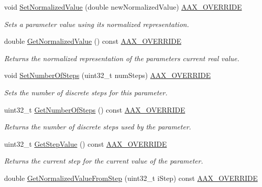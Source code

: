 \begin{Indent}
\begin{DoxyCompactItemize}
void \mbox{\hyperlink{a01537_ac4f8ae8c5ecb2cd04ebc3aa2523449f7}{Set\+Normalized\+Value}} (double new\+Normalized\+Value) \mbox{\hyperlink{a00392_ac2f24a5172689ae684344abdcce55463}{A\+A\+X\+\_\+\+O\+V\+E\+R\+R\+I\+DE}}
\begin{DoxyCompactList}\small\item\em Sets a parameter value using it\textquotesingle{}s normalized representation. \end{DoxyCompactList}\item 
double \mbox{\hyperlink{a01537_a3da77ce2df77961e918418fd2385a50f}{Get\+Normalized\+Value}} () const \mbox{\hyperlink{a00392_ac2f24a5172689ae684344abdcce55463}{A\+A\+X\+\_\+\+O\+V\+E\+R\+R\+I\+DE}}
\begin{DoxyCompactList}\small\item\em Returns the normalized representation of the parameter\textquotesingle{}s current real value. \end{DoxyCompactList}\item 
void \mbox{\hyperlink{a01537_ac1c0ee92affe0379a58411955d27bb2b}{Set\+Number\+Of\+Steps}} (uint32\+\_\+t num\+Steps) \mbox{\hyperlink{a00392_ac2f24a5172689ae684344abdcce55463}{A\+A\+X\+\_\+\+O\+V\+E\+R\+R\+I\+DE}}
\begin{DoxyCompactList}\small\item\em Sets the number of discrete steps for this parameter. \end{DoxyCompactList}\item 
uint32\+\_\+t \mbox{\hyperlink{a01537_afe660c842ca2bc05acb249def909e5e9}{Get\+Number\+Of\+Steps}} () const \mbox{\hyperlink{a00392_ac2f24a5172689ae684344abdcce55463}{A\+A\+X\+\_\+\+O\+V\+E\+R\+R\+I\+DE}}
\begin{DoxyCompactList}\small\item\em Returns the number of discrete steps used by the parameter. \end{DoxyCompactList}\item 
uint32\+\_\+t \mbox{\hyperlink{a01537_a9743c6c0416e93078f377c40e9482021}{Get\+Step\+Value}} () const \mbox{\hyperlink{a00392_ac2f24a5172689ae684344abdcce55463}{A\+A\+X\+\_\+\+O\+V\+E\+R\+R\+I\+DE}}
\begin{DoxyCompactList}\small\item\em Returns the current step for the current value of the parameter. \end{DoxyCompactList}\item 
double \mbox{\hyperlink{a01537_aa2ad88cfd15eae17f5ec18027e738950}{Get\+Normalized\+Value\+From\+Step}} (uint32\+\_\+t i\+Step) const \mbox{\hyperlink{a00392_ac2f24a5172689ae684344abdcce55463}{A\+A\+X\+\_\+\+O\+V\+E\+R\+R\+I\+DE}}

\end{DoxyCompactItemize}
\end{Indent}
